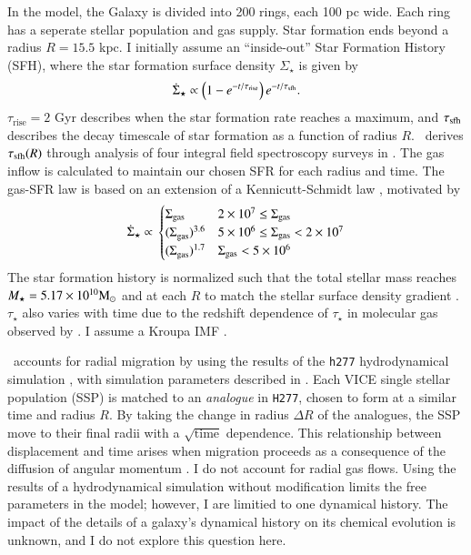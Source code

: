 \documentclass[12pt,oneside]{report}
\newcommand{\JJ}{\citetalias{james+21}}
\begin{document}
In the model, the Galaxy is divided into 200 rings, each 100 pc wide. Each ring has a seperate stellar population and gas supply. Star formation ends beyond a radius $R=15.5$ kpc. I initially assume an ``inside-out'' Star Formation History (SFH), where the star formation surface density $\Sigma_\star$ is given by 
\begin{equation}
    \dot{\Sigma}_\star \propto \left(1-e^{-t/\tau_{\rm rise}}\right) e^{-t/\tau_{\rm sfh}}.
\end{equation}
$\tau_\text{rise}=2$ Gyr describes when the star formation rate reaches a maximum, and $\tau_{\rm sfh}$ describes the decay timescale of star formation as a function of radius $R$. \JJ~derives $\tau_{\rm sfh}(R)$ through analysis of four integral field spectroscopy surveys in \cite{sanches20}.
The gas inflow is calculated to maintain our chosen SFR for each radius and time. The gas-SFR law is based on an extension of a Kennicutt-Schmidt law \citep{kennicutt98}, motivated by 
\begin{equation}
\dot{\Sigma}_{\star} \propto \\
\begin{cases}
    {\Sigma}_{\rm gas} & 2\times 10^7 \leq \Sigma_{\rm gas} \\ 
    {(\Sigma}_{\rm gas})^{3.6} & 5\times 10^6 \leq \Sigma_{\rm gas} < 2\times10^7 \\ 
    {(\Sigma}_{\rm gas})^{1.7} & \Sigma_{\rm gas} < 5\times10^6 \\ 
\end{cases}
\end{equation}
The star formation history is normalized such that the total stellar mass reaches $M_\star=5.17\times10^{10} {\rm M}_\odot$ \citep{LM15} and at each $R$ to match the stellar surface density gradient \citep{BHG16}.
$\tau_\star$ also varies with time due to the redshift dependence of $\tau_\star$ in molecular gas observed by \citet{tacconi18}.
I assume a Kroupa IMF \cite{kroupa01}.


\JJ\ accounts for radial migration by using the results of the \texttt{h277} hydrodynamical simulation \citep{christensen12, zolotov12, loebman12, BZ14}, with simulation parameters described in \citet{bird+21}. Each VICE single stellar population (SSP) is matched to an \textit{analogue} in \texttt{H277}, chosen to form at a similar time and radius $R$. By taking the change in radius $\Delta R$ of the analogues, the SSP move to their final radii with a $\sqrt{\text{time}}$ dependence.
This relationship between displacement and time arises when migration proceeds as a consequence of the diffusion of angular momentum \citep{frankel18, frankel20}.
I do not account for radial gas flows.
Using the results of a hydrodynamical simulation without modification limits the free parameters in the model; however, I are limitied to one dynamical history. The impact of the details of a galaxy's dynamical history on its chemical evolution is unknown, and I do not explore this question here.
\end{document}
